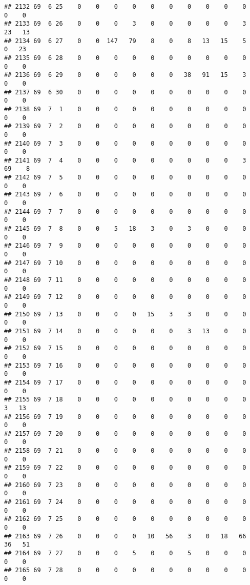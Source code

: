 \documentclass[]{article}
\begin{document}
\begin{verbatim}
## 2132 69  6 25    0    0    0    0    0    0    0    0    0    0    0    0
## 2133 69  6 26    0    0    0    3    0    0    0    0    0    3   23   13
## 2134 69  6 27    0    0  147   79    8    0    8   13   15    5    0   23
## 2135 69  6 28    0    0    0    0    0    0    0    0    0    0    0    0
## 2136 69  6 29    0    0    0    0    0    0   38   91   15    3    0    0
## 2137 69  6 30    0    0    0    0    0    0    0    0    0    0    0    0
## 2138 69  7  1    0    0    0    0    0    0    0    0    0    0    0    0
## 2139 69  7  2    0    0    0    0    0    0    0    0    0    0    0    0
## 2140 69  7  3    0    0    0    0    0    0    0    0    0    0    0    0
## 2141 69  7  4    0    0    0    0    0    0    0    0    0    3   69    8
## 2142 69  7  5    0    0    0    0    0    0    0    0    0    0    0    0
## 2143 69  7  6    0    0    0    0    0    0    0    0    0    0    0    0
## 2144 69  7  7    0    0    0    0    0    0    0    0    0    0    0    0
## 2145 69  7  8    0    0    5   18    3    0    3    0    0    0    0    0
## 2146 69  7  9    0    0    0    0    0    0    0    0    0    0    0    0
## 2147 69  7 10    0    0    0    0    0    0    0    0    0    0    0    0
## 2148 69  7 11    0    0    0    0    0    0    0    0    0    0    0    0
## 2149 69  7 12    0    0    0    0    0    0    0    0    0    0    0    0
## 2150 69  7 13    0    0    0    0   15    3    3    0    0    0    0    0
## 2151 69  7 14    0    0    0    0    0    0    3   13    0    0    0    0
## 2152 69  7 15    0    0    0    0    0    0    0    0    0    0    0    0
## 2153 69  7 16    0    0    0    0    0    0    0    0    0    0    0    0
## 2154 69  7 17    0    0    0    0    0    0    0    0    0    0    0    0
## 2155 69  7 18    0    0    0    0    0    0    0    0    0    0    3   13
## 2156 69  7 19    0    0    0    0    0    0    0    0    0    0    0    0
## 2157 69  7 20    0    0    0    0    0    0    0    0    0    0    0    0
## 2158 69  7 21    0    0    0    0    0    0    0    0    0    0    0    0
## 2159 69  7 22    0    0    0    0    0    0    0    0    0    0    0    0
## 2160 69  7 23    0    0    0    0    0    0    0    0    0    0    0    0
## 2161 69  7 24    0    0    0    0    0    0    0    0    0    0    0    0
## 2162 69  7 25    0    0    0    0    0    0    0    0    0    0    0    0
## 2163 69  7 26    0    0    0    0   10   56    3    0   18   66   36   51
## 2164 69  7 27    0    0    0    5    0    0    5    0    0    0    0    0
## 2165 69  7 28    0    0    0    0    0    0    0    0    0    0    0    0

\end{verbatim}
\end{document}

